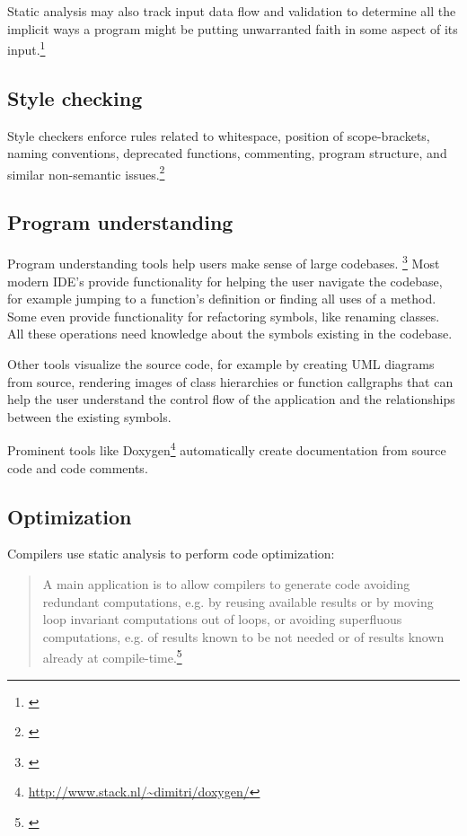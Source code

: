 Static analysis may also track input data flow and validation to determine
all the implicit ways a program might be putting unwarranted faith in some aspect of its input.\footnote{\citep[172]{SecureProgramming}}

\subsection{Style checking}

Style checkers enforce rules related to whitespace, position of scope-brackets, naming conventions, deprecated functions, commenting, program structure, and similar non-semantic issues.\footnote{\citep[25]{SecureProgramming}}


\subsection{Program understanding}

Program understanding tools help users make sense of large codebases. \footnote{\citep[27]{SecureProgramming}} Most modern IDE's provide functionality for helping the user navigate the codebase, for example jumping to a function's definition or finding all uses of a method. Some even provide functionality for refactoring symbols, like renaming classes. All these operations need knowledge about the symbols existing in the codebase.

Other tools visualize the source code, for example by creating UML diagrams from source, rendering images of class hierarchies or function callgraphs that can help the user understand the control flow of the application and the relationships between the existing symbols.


Prominent tools like Doxygen\footnote{\url{http://www.stack.nl/~dimitri/doxygen/}} automatically create documentation from source code and code comments.

\subsection{Optimization}

Compilers use static analysis to perform code optimization:

\begin{quotation}
A main application is to allow compilers to generate code avoiding redundant computations, e.g. by reusing available results or by moving loop invariant computations out of loops, or avoiding superfluous computations, e.g. of results known to be not needed or of results known already at compile-time.\footnote{\citep[1]{ProgramAnalysis}}
\end{quotation}

